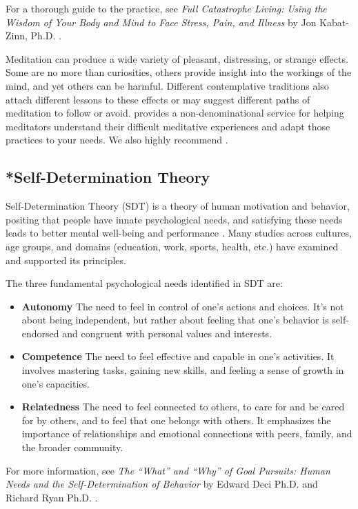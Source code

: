 \documentclass[12pt,letterpaper]{article}
\begin{document}
For a thorough guide to the practice, see \textit{Full Catastrophe Living: Using the Wisdom of Your Body and Mind to Face Stress, Pain, and Illness} by Jon Kabat-Zinn, Ph.D. \cite{kabat-zinnMBSR}.

Meditation can produce a wide variety of pleasant, distressing, or strange effects. Some are no more than curiosities, others provide insight into the workings of the mind, and yet others can be harmful. Different contemplative traditions also attach different lessons to these effects or may suggest different paths of meditation to follow or avoid. \textcite{cheetahHouse} provides a non-denominational service for helping meditators understand their difficult meditative experiences and adapt those practices to your needs. We also highly recommend \textcite{treleaven2018trauma}.
\subsection{*Self-Determination Theory}
\label{sec:sdt}
Self-Determination Theory (SDT) is a theory of human motivation and behavior, positing that people have innate psychological needs, and satisfying these needs leads to better mental well-being and performance \cite{deciSDT}. Many studies across cultures, age groups, and domains (education, work, sports, health, etc.) have examined and supported its principles.

The three fundamental psychological needs identified in SDT are:
\begin{itemize}
    \item \textbf{Autonomy} The need to feel in control of one's actions and choices. It's not about being independent, but rather about feeling that one's behavior is self-endorsed and congruent with personal values and interests.
    \item \textbf{Competence} The need to feel effective and capable in one's activities. It involves mastering tasks, gaining new skills, and feeling a sense of growth in one's capacities.
    \item \textbf{Relatedness} The need to feel connected to others, to care for and be cared for by others, and to feel that one belongs with others. It emphasizes the importance of relationships and emotional connections with peers, family, and the broader community.
\end{itemize}
For more information, see \textit{The “What” and “Why” of Goal Pursuits: Human Needs and the Self-Determination of Behavior} by Edward Deci Ph.D. and Richard Ryan Ph.D. \cite{deciSDT}.
\end{document}

